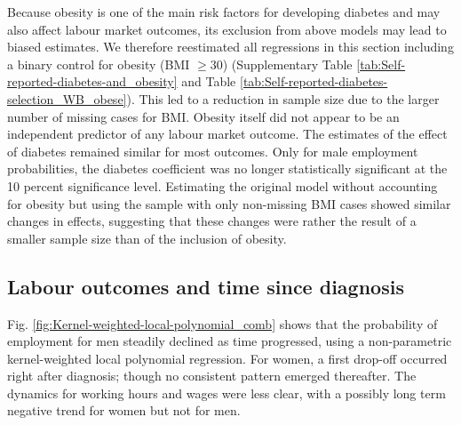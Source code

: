 \documentclass[12pt,english]{article}
\providecommand{\DIFaddtex}[1]{{\protect\color{blue}#1}} %
\providecommand{\DIFaddbegin}{} %
\providecommand{\DIFaddend}{} %
\providecommand{\DIFadd}[1]{\texorpdfstring{\DIFaddtex{#1}}{#1}} %
\begin{document}
\DIFaddbegin \DIFadd{Because obesity is one of the main risk factors for developing diabetes and may also affect labour market outcomes, its exclusion from above models may lead to biased estimates. We therefore reestimated all regressions in this section including a binary control for obesity (BMI $\geq 30$) (Supplementary Table \ref{tab:Self-reported-diabetes-and_obesity} and Table \ref{tab:Self-reported-diabetes-selection_WB_obese}). This led to a reduction in sample size due to the larger number of missing cases for BMI. Obesity itself did not appear to be an independent predictor of any labour market outcome. The estimates of the effect of diabetes remained similar for most outcomes. Only for male employment probabilities, the diabetes coefficient was no longer statistically significant at the 10 percent significance level. Estimating the original model without accounting for obesity but using the sample with only non-missing BMI cases showed similar changes in effects, suggesting that these changes were rather the result of a smaller sample size than of the inclusion of obesity.
}


\DIFaddend \subsection{\label{sec:duration}Labour outcomes and time since diagnosis }

Fig. \ref{fig:Kernel-weighted-local-polynomial_comb} shows that the probability of employment for men steadily declined as time progressed, using a non-parametric kernel-weighted local polynomial regression. For women, a first drop-off occurred right after diagnosis; though no consistent pattern emerged thereafter. The dynamics for working hours and wages were less clear, with a possibly long term negative trend for women but not for men.
\end{document}
